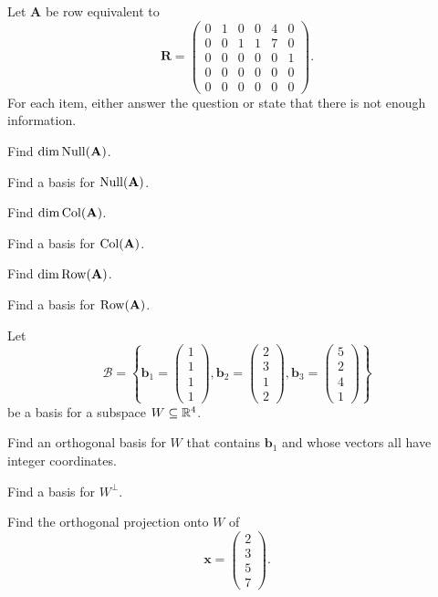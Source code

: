 \begin{problem}
Let $\mathbf A$ be row equivalent to
\[
\mathbf R=
\begin{pmatrix}
0&1&0&0&4&0\\
0&0&1&1&7&0\\
0&0&0&0&0&1\\
0&0&0&0&0&0\\
0&0&0&0&0&0
\end{pmatrix}.
\]
For each item, either answer the question or state that there is not enough information.
\begin{problemsubparts}
\item Find $\dim\operatorname{Null}(\mathbf A)$.
\item Find a basis for $\operatorname{Null}(\mathbf A)$.
\item Find $\dim\operatorname{Col}(\mathbf A)$.
\item Find a basis for $\operatorname{Col}(\mathbf A)$.
\item Find $\dim\operatorname{Row}(\mathbf A)$.
\item Find a basis for $\operatorname{Row}(\mathbf A)$.
\end{problemsubparts}
\end{problem}

\begin{problem}
Let
\[
\mathcal B=
\left\{
\mathbf b_1=
\begin{pmatrix}1\\1\\1\\1\end{pmatrix},
\mathbf b_2=
\begin{pmatrix}2\\3\\1\\2\end{pmatrix},
\mathbf b_3=
\begin{pmatrix}5\\2\\4\\1\end{pmatrix}
\right\}
\]
be a basis for a subspace $W\subseteq\mathbb{R}^4$.
\begin{problemsubparts}
\item Find an orthogonal basis for $W$ that contains $\mathbf b_1$ and whose vectors all have integer coordinates.
\item Find a basis for $W^\perp$.
\item Find the orthogonal projection onto $W$ of
\[
\mathbf x=
\begin{pmatrix}2\\3\\5\\7\end{pmatrix}.
\]
\end{problemsubparts}
\end{problem}

